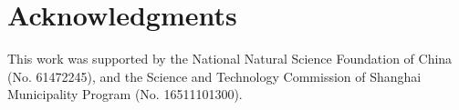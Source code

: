 \documentclass[journal]{IEEEtran}
\begin{document}
%



\section*{Acknowledgments}

This work was supported by the National Natural Science Foundation of China (No. 61472245), and the Science and Technology Commission of Shanghai Municipality Program (No. 16511101300).

\ifCLASSOPTIONcaptionsoff
  \newpage
\fi







%
%
%
\end{document}
